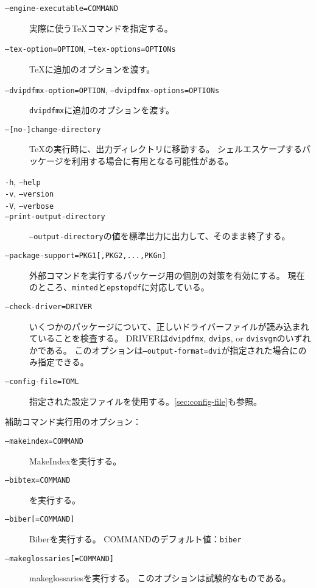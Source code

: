 \documentclass[a4paper]{ltjsreport}
\newcommand\metavar[1]{\textsf{#1}}
\begin{document}
\begin{description}
\item[\texttt{--engine-executable=\metavar{COMMAND}}]
  実際に使う\TeX{}コマンドを指定する。
\item[\texttt{--tex-option=\metavar{OPTION}}, \texttt{--tex-options=\metavar{OPTIONs}}]
  \TeX{}に追加のオプションを渡す。
\item[\texttt{--dvipdfmx-option=\metavar{OPTION}}, \texttt{--dvipdfmx-options=\metavar{OPTIONs}}]
  \texttt{dvipdfmx}に追加のオプションを渡す。
\item[\texttt{--[no-]change-directory}]
  \TeX{}の実行時に、出力ディレクトリに移動する。
  シェルエスケープするパッケージを利用する場合に有用となる可能性がある。
\item[\texttt{-h}, \texttt{--help}]
\item[\texttt{-v}, \texttt{--version}]
\item[\texttt{-V}, \texttt{--verbose}]
\item[\texttt{--print-output-directory}]
  \texttt{--output-directory}の値を標準出力に出力して、そのまま終了する。
\item[\texttt{--package-support=PKG1[,PKG2,...,PKGn]}]
  外部コマンドを実行するパッケージ用の個別の対策を有効にする。
  現在のところ、\texttt{minted}と\texttt{epstopdf}に対応している。
\item[\texttt{--check-driver=DRIVER}]
  いくつかのパッケージについて、正しいドライバーファイルが読み込まれていることを検査する。
  \metavar{DRIVER}は\texttt{dvipdfmx}, \texttt{dvips}, or \texttt{dvisvgm}のいずれかである。
  このオプションは\texttt{--output-format=dvi}が指定された場合にのみ指定できる。
\item[\texttt{--config-file=TOML}]
  指定された設定ファイルを使用する。\cref{sec:config-file}も参照。
\end{description}

補助コマンド実行用のオプション：
\begin{description}
\item[\texttt{--makeindex=\metavar{COMMAND}}]
  MakeIndexを実行する。
\item[\texttt{--bibtex=\metavar{COMMAND}}]
  \BibTeX{}を実行する。
\item[\texttt{--biber[=\metavar{COMMAND}]}]
  Biberを実行する。
  \metavar{COMMAND}のデフォルト値：\texttt{biber}
\item[\texttt{--makeglossaries[=\metavar{COMMAND}]}]
  makeglossariesを実行する。
  このオプションは試験的なものである。
\end{description}
\end{document}

